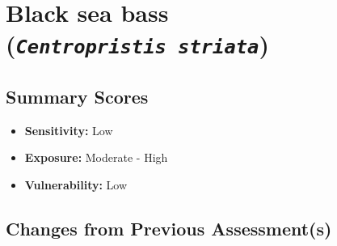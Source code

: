 \documentclass[
  letterpaper,
  DIV=11,
  numbers=noendperiod]{scrartcl}
\author{}
\date{}
\providecommand{\tightlist}{%
  \setlength{\itemsep}{0pt}\setlength{\parskip}{0pt}}\usepackage{longtable,booktabs,array}
\begin{document}
\section{\texorpdfstring{Black sea bass
(\emph{\texttt{Centropristis\ striata}})}{Black sea bass (Centropristis striata)}}\label{black-sea-bass-centropristis-striata}

\subsection{Summary Scores}\label{summary-scores}

\begin{itemize}
\tightlist
\item
  \textbf{Sensitivity:} Low
\item
  \textbf{Exposure:} Moderate - High
\item
  \textbf{Vulnerability:} Low
\end{itemize}

\subsection{Changes from Previous
Assessment(s)}\label{changes-from-previous-assessments}
\end{document}

